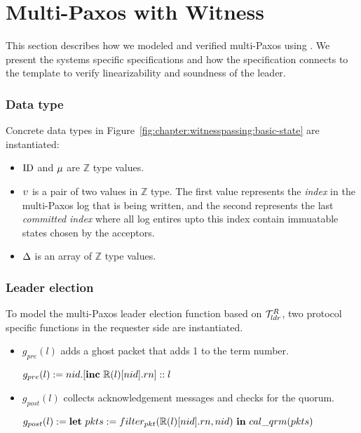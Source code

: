 
\section{Multi-Paxos with Witness}
\label{chapter:witnesspassing:sec:multipaxos-with-witness}


This section describes how we modeled and verified multi-Paxos using 
\sysname{}. We present the systems specific specifications and how the
specification connects to the template to verify linearizability and soundness
of the leader. 

\subsubsection{Data type}

Concrete data types in Figure~\ref{fig:chapter:witnesspassing:basic-state} are instantiated:
\begin{itemize}
\item $\mathrm{ID}$ and $\mu$ are $\mathbb{Z}$ type values.
\item $\upsilon$ is a pair of two values in $\mathbb{Z}$ type. The first value represents 
the \textit{index} in the multi-Paxos log that is being written, and the 
second represents the last \textit{committed index} where all log entires upto this
index contain immuatable states chosen by the acceptors.
\item $\Delta$ is an array of $\mathbb{Z}$ type values.
\end{itemize}

\subsubsection{Leader election}
To model the multi-Paxos leader election function based on $\mathcal{T}^{R}_{ldr}$,
two protocol specific functions in the requester side are instantiated.
\begin{itemize}
\item $g_{pre} (l)$ adds a ghost packet that adds 1 to the term number.
\begin{center}
$g_{pre} (l) := nid.[\mbox{\textbf{inc}} \ \replay(l)[nid].rn]::l$
\end{center}
\item $g_{post} (l)$ collects acknowledgement messages and checks for the
	quorum.
	\begin{center}
$g_{post} (l) := \mbox{\textbf{let}}\ pkts := filter_{pkt}(\replay(l)[nid].rn, nid)\ \mbox{\textbf{in}} \ cal\_qrm(pkts)$
\end{center}
\end{itemize}

